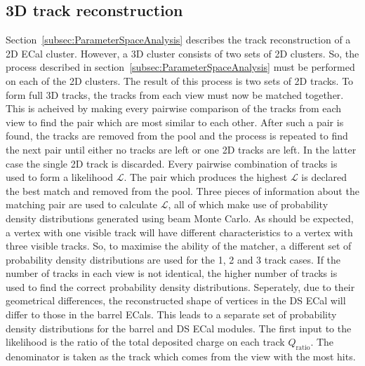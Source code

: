 \subsection{3D track reconstruction}
\label{subsec:3DHoughTrackReconstruction}
Section~\ref{subsec:ParameterSpaceAnalysis} describes the track reconstruction of a 2D ECal cluster.  However, a 3D cluster consists of two sets of 2D clusters.  So, the process described in section~\ref{subsec:ParameterSpaceAnalysis} must be performed on each of the 2D clusters.  The result of this process is two sets of 2D tracks.  To form full 3D tracks, the tracks from each view must now be matched together.  This is acheived by making every pairwise comparison of the tracks from each view to find the pair which are most similar to each other.  After such a pair is found, the tracks are removed from the pool and the process is repeated to find the next pair until either no tracks are left or one 2D tracks are left.  In the latter case the single 2D track is discarded. Every pairwise combination of tracks is used to form a likelihood $\mathcal{L}$.  The pair which produces the highest $\mathcal{L}$ is declared the best match and removed from the pool.  Three pieces of information about the matching pair are used to calculate $\mathcal{L}$, all of which make use of probability density distributions generated using beam Monte Carlo.  
As should be expected, a vertex with one visible track will have different characteristics to a vertex with three visible tracks.  So, to maximise the ability of the matcher, a different set of probability density distributions are used for the 1, 2 and 3 track cases.  If the number of tracks in each view is not identical, the higher number of tracks is used to find the correct probability density distributions.  Seperately, due to their geometrical differences, the reconstructed shape of vertices in the DS ECal will differ to those in the barrel ECals.  This leads to a separate set of probability density distributions for the barrel and DS ECal modules.
The first input to the likelihood is the ratio of the total deposited charge on each track $Q_{\textrm{ratio}}$.  The denominator is taken as the track which comes from the view with the most hits.
